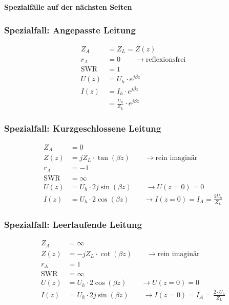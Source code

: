 \vspace{20pt}
\textbf{Spezialfälle auf der nächsten Seiten}
\pagebreak

\subsubsection{Spezialfall: Angepasste Leitung}
\begin{align*}
    Z_A          & = Z_L = Z(z)                              \\
    r_A          & = 0\qquad\rightarrow\text{reflexionsfrei} \\
    \mathrm{SWR} & = 1                                       \\
    U(z)         & = U_h\cdot e ^{j\beta z}                  \\
    I(z)         & = I_h \cdot e^{j\beta z}                  \\
                 & = \frac{U_h}{Z_L}\cdot e^{j\beta z}
\end{align*}

\subsubsection{Spezialfall: Kurzgeschlossene Leitung}
\begin{align*}
    Z_A          & = 0                                                                        \\
    Z(z)         & = j Z_L\cdot\tan(\beta z)        \qquad\rightarrow\text{rein imaginär}     \\
    r_A          & = -1                                                                       \\
    \mathrm{SWR} & = \infty                                                                   \\
    U(z)         & = U_h\cdot 2j\sin(\beta z)    \qquad\rightarrow U(z=0)=0                   \\
    I(z)         & = U_h\cdot 2\cos(\beta z)    \qquad\rightarrow I(z=0)=I_A=\frac{2U_h}{Z_L}
\end{align*}

\subsubsection{Spezialfall: Leerlaufende Leitung}
\begin{align*}
    Z_A          & = \infty                                                                         \\
    Z(z)         & = -jZ_L\cdot \cot(\beta z) \qquad\rightarrow\text{rein imaginär}                 \\
    r_A          & = 1                                                                              \\
    \mathrm{SWR} & = \infty                                                                         \\
    U(z)         & = U_h\cdot 2\cos(\beta z) \qquad\rightarrow U(z=0)=0                             \\
    I(z)         & = U_h\cdot 2j\sin(\beta z) \qquad\rightarrow I(z=0)=I_A = \frac{2\cdot U_h}{Z_L}
\end{align*}

